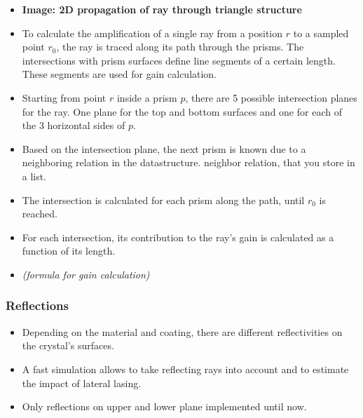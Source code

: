 \begin{itemize}

  \item \textbf{Image: 2D propagation of ray through triangle structure}

  \item To calculate the amplification of a single ray from a position $r$
    to a sampled point $r_0$, the ray is traced along its path through the
    prisms. The intersections with prism surfaces define line segments of a
    certain length. These segments are used for gain calculation.

  \item Starting from point $r$ inside a prism $p$, there are 5 possible
    intersection planes for the ray. One plane for the top and bottom
    surfaces and one for each of the 3 horizontal sides of $p$.

  \item Based on the intersection plane, the next prism is known due to a
    neighboring relation in the datastructure.  neighbor relation, that you
    store in a list.

  \item The intersection is calculated for each prism along the path, until
    $r_0$ is reached.
  
  \item For each intersection, its contribution to the ray's gain is calculated
    as a function of its length.

  \item \textit{(formula for gain calculation)}

\end{itemize}



\subsubsection{Reflections}

\begin{itemize}

  \item Depending on the material and coating, there are different
    reflectivities on the crystal's surfaces.

  \item A fast simulation allows to take reflecting rays into account and to
    estimate the impact of lateral lasing.

  \item Only reflections on upper and lower plane implemented until now.

\end{itemize}



